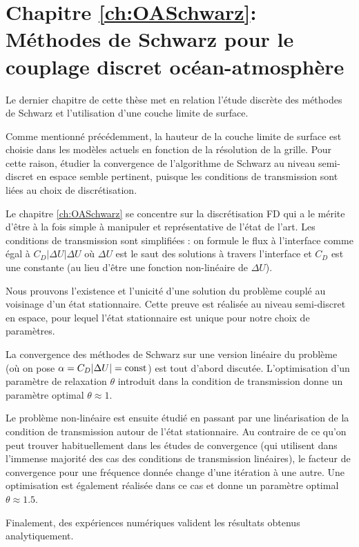 \section*{Chapitre \ref{ch:OASchwarz}: Méthodes de Schwarz pour le couplage
discret océan-atmosphère}
Le dernier chapitre de cette thèse met en relation l'étude discrète
des méthodes de Schwarz et l'utilisation d'une couche limite de
surface.
	\par Comme mentionné précédemment,
	la hauteur de la couche limite de surface est
	choisie dans les modèles actuels en fonction de la
	résolution de la grille.
		Pour cette raison, étudier la convergence de
		l'algorithme de Schwarz
		au niveau semi-discret en espace semble pertinent,
		puisque les conditions de transmission sont
		liées au choix de discrétisation.
	\par Le chapitre \ref{ch:OASchwarz} se concentre sur la discrétisation FD
		qui a le mérite d'être à la fois simple à
		manipuler et représentative de l'état de l'art.
		Les conditions de transmission sont simplifiées :
		on formule le flux à l'interface comme égal à
		$C_D |\Delta U| \Delta U$ où $\Delta U$ est le saut
		des solutions à travers l'interface et $C_D$ est
		une constante
		(au lieu d'être une fonction non-linéaire de
		$\Delta U$).
	\par Nous prouvons l'existence et l'unicité
	d'une solution du problème couplé au voisinage d'un état
		stationnaire. Cette preuve est réalisée au niveau
		semi-discret en espace, pour lequel l'état
		stationnaire est unique pour notre choix de
		paramètres.
	\par La convergence des méthodes de Schwarz sur une version
		linéaire du problème (où on pose
		$\alpha=C_D |\Delta U| = {\rm const}$)
		est tout d'abord discutée. L'optimisation d'un
		paramètre de relaxation $\theta$ introduit dans
		la condition de transmission donne un paramètre
		optimal $\theta \approx 1$.
	\par Le problème non-linéaire est ensuite étudié en passant
		par une linéarisation de la condition de transmission
		autour de l'état stationnaire. Au contraire
		de ce qu'on peut trouver habituellement dans
		les études de convergence (qui utilisent dans
		l'immense majorité des cas des conditions de
		transmission linéaires),
		le facteur de convergence pour une fréquence donnée
		change d'une itération à une autre. 
		Une optimisation est également réalisée dans ce cas
		et donne un paramètre optimal $\theta \approx 1.5$.
	\par Finalement, des expériences numériques
		valident les résultats obtenus analytiquement.
